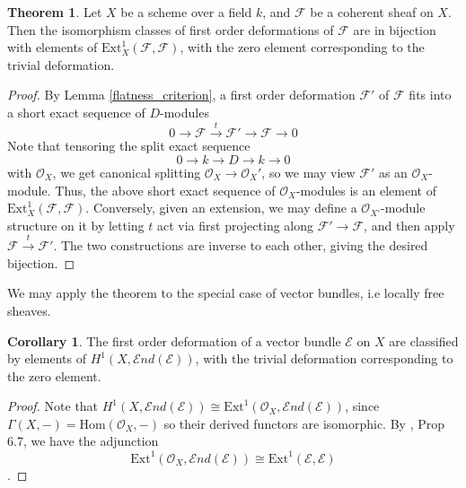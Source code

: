 \documentclass{article}
\newcommand{\Hom}{\textrm{Hom}}
\theoremstyle{definition}
\newtheorem{theorem}{Theorem}[section]
\theoremstyle{definition}
\theoremstyle{definition}
\theoremstyle{definition}
\theoremstyle{definition}
\theoremstyle{definition}
\newtheorem{corollary}{Corollary}[theorem]
\theoremstyle{definition}
\begin{document}
\begin{theorem}
	Let $X$ be a scheme over a field $k$, and $\mathcal{F}$ be a coherent sheaf on $X$. Then the isomorphism classes of first order deformations of $\mathcal{F}$ are in bijection with elements of $\mathrm{Ext}^1_X(\mathcal{F}, \mathcal{F})$, with the zero element corresponding to the trivial deformation.
\end{theorem}
\begin{proof}
	By Lemma \ref{flatness_criterion}, a first order deformation $\mathcal{F}'$ of $\mathcal{F}$ fits into a short exact sequence of $D$-modules
	\[0\to \mathcal{F}\xrightarrow{t} \mathcal{F}'\to \mathcal{F}\to 0\]
	Note that tensoring the split exact sequence 
\[0\to k\to D\to k\to 0\]
with $\mathcal{O}_X$, we get canonical splitting $\mathcal{O}_X\to \mathcal{O}_X'$, so we may view $\mathcal{F}'$ as an $\mathcal{O}_X$-module. Thus, the above short exact sequence of $\mathcal{O}_X$-modules is an element of $\mathrm{Ext}^1_X(\mathcal{F}, \mathcal{F})$. Conversely, given an extension, we may define a $\mathcal{O}_{X'}$-module structure on it by letting $t$ act via first projecting along $\mathcal{F}'\to \mathcal{F}$, and then apply $\mathcal{F}\xrightarrow{t} \mathcal{F}'$. The two constructions are inverse to each other, giving the desired bijection.

\end{proof} 

We may apply the theorem to the special case of vector bundles, i.e locally free sheaves. 

\begin{corollary}
	\label{def_vector_bundle}
	The first order deformation of a vector bundle $\mathcal{E}$ on $X$ are classified by elements of $H^1(X, \mathcal{E}nd(\mathcal{E}))$, with the trivial deformation corresponding to the zero element.
\end{corollary}
\begin{proof}
		Note that $H^1(X, \mathcal{E}nd(\mathcal{E}))\cong \textrm{Ext}^1(\mathcal{O}_X,  \mathcal{E}nd(\mathcal{E}))$, since $\Gamma(X, -)= \Hom(\mathcal{O}_X, -)$ so their derived functors are isomorphic. By \cite{Hartshorne}, Prop 6.7, we have the adjunction 
	\[\textrm{Ext}^1(\mathcal{O}_X,  \mathcal{E}nd(\mathcal{E}))\cong \textrm{Ext}^1(\mathcal{E},  \mathcal{E})\].
\end{proof}
\end{document}
